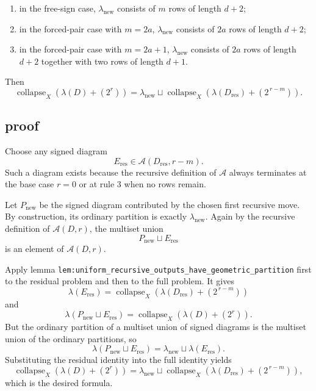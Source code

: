 \documentclass[
]{article}
\providecommand{\tightlist}{%
  \setlength{\itemsep}{0pt}\setlength{\parskip}{0pt}}
\begin{document}
\begin{enumerate}
\def\labelenumi{\arabic{enumi}.}
\tightlist
\item
  in the free-sign case, \(\lambda_{\mathrm{new}}\) consists of \(m\)
  rows of length \(d+2\);
\item
  in the forced-pair case with \(m=2a\), \(\lambda_{\mathrm{new}}\)
  consists of \(2a\) rows of length \(d+2\);
\item
  in the forced-pair case with \(m=2a+1\), \(\lambda_{\mathrm{new}}\)
  consists of \(2a\) rows of length \(d+2\) together with two rows of
  length \(d+1\).
\end{enumerate}

Then \[
\operatorname{collapse}_X(\lambda(D)+(2^r))
=
\lambda_{\mathrm{new}}\sqcup
\operatorname{collapse}_X(\lambda(D_{\mathrm{res}})+(2^{\,r-m})).
\]

\subsection{proof}\label{proof-24}

Choose any signed diagram \[
E_{\mathrm{res}}\in \mathcal A(D_{\mathrm{res}},r-m).
\] Such a diagram exists because the recursive definition of
\(\mathcal A\) always terminates at the base case \(r=0\) or at rule
\(3\) when no rows remain.

Let \(P_{\mathrm{new}}\) be the signed diagram contributed by the chosen
first recursive move. By construction, its ordinary partition is exactly
\(\lambda_{\mathrm{new}}\). Again by the recursive definition of
\(\mathcal A(D,r)\), the multiset union \[
P_{\mathrm{new}}\sqcup E_{\mathrm{res}}
\] is an element of \(\mathcal A(D,r)\).

Apply lemma
\texttt{lem:uniform\_recursive\_outputs\_have\_geometric\_partition}
first to the residual problem and then to the full problem. It gives \[
\lambda(E_{\mathrm{res}})
=
\operatorname{collapse}_X(\lambda(D_{\mathrm{res}})+(2^{\,r-m}))
\] and \[
\lambda(P_{\mathrm{new}}\sqcup E_{\mathrm{res}})
=
\operatorname{collapse}_X(\lambda(D)+(2^r)).
\] But the ordinary partition of a multiset union of signed diagrams is
the multiset union of the ordinary partitions, so \[
\lambda(P_{\mathrm{new}}\sqcup E_{\mathrm{res}})
=
\lambda_{\mathrm{new}}\sqcup \lambda(E_{\mathrm{res}}).
\] Substituting the residual identity into the full identity yields \[
\operatorname{collapse}_X(\lambda(D)+(2^r))
=
\lambda_{\mathrm{new}}\sqcup
\operatorname{collapse}_X(\lambda(D_{\mathrm{res}})+(2^{\,r-m})),
\] which is the desired formula.
\end{document}
